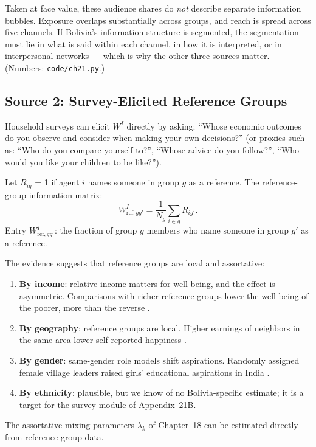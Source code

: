 \documentclass[../structural_economics_book.tex]{subfiles}
\begin{document}
\begin{example}
Taken at face value, these audience shares do \emph{not} describe separate information bubbles. Exposure overlaps substantially across groups, and reach is spread across five channels. If Bolivia's information structure is segmented, the segmentation must lie in what is said within each channel, in how it is interpreted, or in interpersonal networks --- which is why the other three sources matter. (Numbers: \texttt{code/ch21.py}.)
\end{example}


\subsection{Source 2: Survey-Elicited Reference Groups}

\begin{definition}\label{ch21:def:reference_WI}
Household surveys can elicit $W^I$ directly by asking: ``Whose economic outcomes do you observe and consider when making your own decisions?'' (or proxies such as: ``Who do you compare yourself to?'', ``Whose advice do you follow?'', ``Who would you like your children to be like?'').

Let $R_{ig}$ = 1 if agent $i$ names someone in group $g$ as a reference. The reference-group information matrix:
\begin{equation}\label{ch21:eq:reference_WI}
W^I_{\text{ref}, gg'} = \frac{1}{N_g}\sum_{i \in g} R_{ig'}.
\end{equation}
Entry $W^I_{\text{ref}, gg'}$: the fraction of group $g$ members who name someone in group $g'$ as a reference.
\end{definition}

\begin{stylizedfact}\label{ch21:prop:reference_assortative}
The evidence suggests that reference groups are local and assortative:
\begin{enumerate}
\item \textbf{By income}: relative income matters for well-being, and the effect is asymmetric. Comparisons with richer reference groups lower the well-being of the poorer, more than the reverse \citep{ferrericarbonell2005income}.
\item \textbf{By geography}: reference groups are local. Higher earnings of neighbors in the same area lower self-reported happiness \citep{luttmer2005neighbors}.
\item \textbf{By gender}: same-gender role models shift aspirations. Randomly assigned female village leaders raised girls' educational aspirations in India \citep{beaman2012female}.
\item \textbf{By ethnicity}: plausible, but we know of no Bolivia-specific estimate; it is a target for the survey module of Appendix~21B.
\end{enumerate}
The assortative mixing parameters $\lambda_k$ of Chapter~18 can be estimated directly from reference-group data.
\end{stylizedfact}
\end{document}

